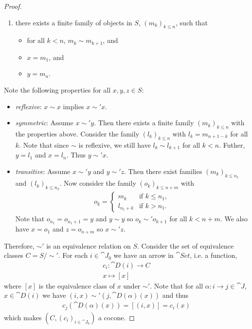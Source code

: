 \documentclass{article}
\begin{document}
\begin{proof}
\begin{enumerate}[label=E\arabic*.]
		\item there exists a finite family of objects in $S$, $(m_k)_{k\leq n}$, such that \begin{itemize}
			      \item for all $k<n$, $m_k\sim m_{k+1}$, and
			      \item $x=m_1$, and
			      \item $y=m_n$.
		      \end{itemize}
	\end{enumerate}
	Note the following properties for all $x,y,z\in S$:
	\begin{itemize}
		\item \emph{reflexive}: $x\sim x$ implies $x\sim'x$.
		\item \emph{symmetric}: Assume $x\sim'y$. Then there exists a finite family $(m_k)_{k\leq n}$ with the properties above.
		      Consider the family $(l_k)_{k\leq n}$ with $l_k = m_{n+1-k}$ for all $k$. Note that since $\sim$ is reflexive,
		      we still have $l_k\sim l_{k+1}$ for all $k<n$. Futher, $y=l_1$ and $x=l_n$. Thus $y\sim'x$.
		\item \emph{transitive}: Assume $x\sim'y$ and $y\sim'z$. Then there exist families $(m_k)_{k\leq n_1}$ and $(l_k)_{k\leq n_2}$.
		      Now consider the family $(o_k)_{k\leq n+m}$ with \begin{align*}
			      o_k = \begin{cases}
				      m_k       & \text{if } k\leq n_1, \\
				      l_{n_1+k} & \text{if } k > n_1.
			      \end{cases}
		      \end{align*}
		      Note that $o_{n_1}=o_{n_1+1}=y$ and $y\sim y$ so $o_k \sim' o_{k+1}$ for all $k<n+m$. We also have $x=o_1$ and $z=o_{n+m}$ so $x\sim'z$.
	\end{itemize}
	Therefore, $\sim'$ is an equivalence relation on $S$. Consider the set of equivalence classes $C=S/\sim'$.
	For each $i\in\cat J_0$ we have an arrow in $\cat{Set}$, i.e. a function,
	\begin{align*}
		c_i : \cat D(i) \to C \\
		x \mapsto [x]
	\end{align*}
	where $[x]$ is the equivalence class of $x$ under $\sim'$.
	Note that  for all $\alpha:i\to j\in\cat J$, $x\in \cat D(i)$ we have $(i,x)\sim'(j,\cat D(\alpha)(x))$ and thus
	\begin{align*}
		c_j(\cat D(\alpha)(x)) = [(i,x)] = c_i(x)
	\end{align*}
	which makes $(C, (c_i)_{i\in\cat J_0})$ a cocone.
\end{proof}
\end{document}
